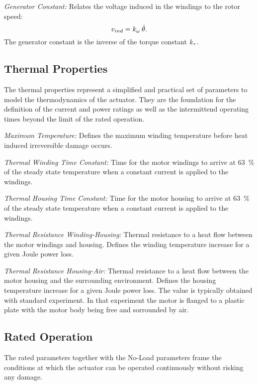 \documentclass[a4paper,10pt]{cjtdsheet}      %
\begin{document}
\begin{multicols}{2}
\emph{Generator Constant:} Relates the voltage induced in the windings to the rotor speed:
\begin{equation}
	v_{ind} = k_\omega \: \dot{\theta}.
\end{equation}
The generator constant is the inverse of the torque constant $k_\tau$.

%
%
\subsection*{\textcolor{cjtred}{Thermal Properties}}
The thermal properties represent a simplified and practical set of parameters to model the thermodynamics of the actuator. They are the foundation for the definition of the current and power ratings as well as the intermittend operating times beyond the limit of the rated operation.

\emph{Maximum Temperature:} Defines the maximum winding temperature before heat induced irreversible damage occurs.

\emph{Thermal Winding Time Constant:} Time for the motor windings to arrive at 63~\% of the steady state temperature when a constant current is applied to the windings.

\emph{Thermal Housing Time Constant:} Time for the motor housing to arrive at 63~\% of the steady state temperature when a constant current is applied to the windings.

\emph{Thermal Resistance Winding-Housing:} Thermal resistance to a heat flow between the motor windings and housing. Defines the winding temperature increase for a given Joule power loss.

\emph{Thermal Resistance Housing-Air:} Thermal resistance to a heat flow between the motor housing and the surrounding environment. Defines the housing temperature increase for a given Joule power loss. The value is typically obtained with standard experiment. In that experiment the motor is flanged to a plastic plate with the motor body being free and sorrounded by air.

%
%
\subsection*{\textcolor{cjtred}{Rated Operation}}
The rated parameters together with the No-Load parameters frame the conditions at which the actuator can be operated continuously without risking any damage.


\end{multicols}
\end{document}
